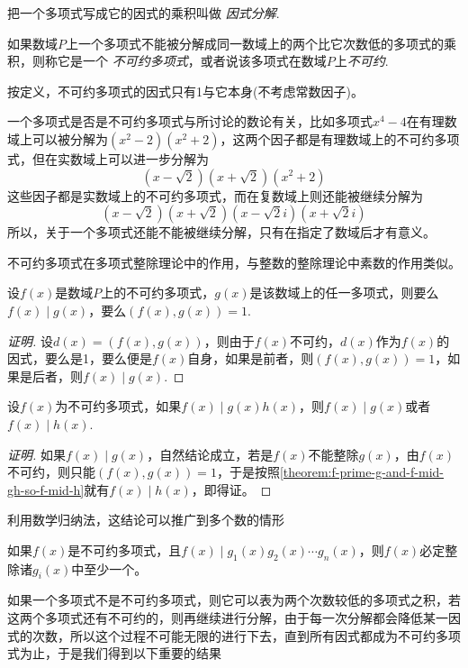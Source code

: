 把一个多项式写成它的因式的乘积叫做 \emph{因式分解}.

\begin{definition}
  如果数域$P$上一个多项式不能被分解成同一数域上的两个比它次数低的多项式的乘积，则称它是一个 \emph{不可约多项式}，或者说该多项式在数域$P$上\emph{不可约}.
\end{definition}

按定义，不可约多项式的因式只有1与它本身(不考虑常数因子)。

一个多项式是否是不可约多项式与所讨论的数论有关，比如多项式$x^4-4$在有理数域上可以被分解为$(x^2-2)(x^2+2)$，这两个因子都是有理数域上的不可约多项式，但在实数域上可以进一步分解为
\[ (x-\sqrt{2})(x+\sqrt{2})(x^2+2) \]
这些因子都是实数域上的不可约多项式，而在复数域上则还能被继续分解为
\[ (x-\sqrt{2})(x+\sqrt{2})(x-\sqrt{2}i)(x+\sqrt{2}i) \]
所以，关于一个多项式还能不能被继续分解，只有在指定了数域后才有意义。

不可约多项式在多项式整除理论中的作用，与整数的整除理论中素数的作用类似。

\begin{theorem}
  设$f(x)$是数域$P$上的不可约多项式，$g(x)$是该数域上的任一多项式，则要么$f(x) \mid g(x)$，要么$(f(x), g(x))=1$.
\end{theorem}

\begin{proof}[证明]
  设$d(x) = (f(x), g(x))$，则由于$f(x)$不可约，$d(x)$作为$f(x)$的因式，要么是1，要么便是$f(x)$自身，如果是前者，则$(f(x),g(x))=1$，如果是后者，则$f(x) \mid g(x)$.
\end{proof}

\begin{inference}
  设$f(x)$为不可约多项式，如果$f(x) \mid g(x)h(x)$，则$f(x) \mid g(x)$或者$f(x) \mid h(x)$.
\end{inference}

\begin{proof}[证明]
  如果$f(x) \mid g(x)$，自然结论成立，若是$f(x)$不能整除$g(x)$，由$f(x)$不可约，则只能$(f(x), g(x))=1$，于是按照\autoref{theorem:f-prime-g-and-f-mid-gh-so-f-mid-h}就有$f(x) \mid h(x)$，即得证。
\end{proof}

利用数学归纳法，这结论可以推广到多个数的情形
\begin{inference}
  如果$f(x)$是不可约多项式，且$f(x) \mid g_1(x)g_2(x) \cdots g_n(x)$，则$f(x)$必定整除诸$g_i(x)$中至少一个。
\end{inference}

如果一个多项式不是不可约多项式，则它可以表为两个次数较低的多项式之积，若这两个多项式还有不可约的，则再继续进行分解，由于每一次分解都会降低某一因式的次数，所以这个过程不可能无限的进行下去，直到所有因式都成为不可约多项式为止，于是我们得到以下重要的结果

